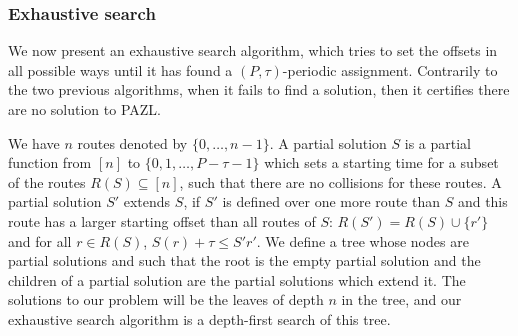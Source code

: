 \documentclass[a4paper,10pt]{article}
\begin{document}
	\subsubsection*{Exhaustive search}
% 
% 

% 	    
      We now present an exhaustive search algorithm, which tries to set the offsets in all possible ways until it has found a $(P,\tau)$-periodic assignment. Contrarily to the two previous algorithms, when it fails to find a solution, then it certifies there are no solution to PAZL.
      
      We have $n$ routes denoted by $\{0,\dots,n-1\}$. A partial solution $S$ is 
      a partial function from $[n]$ to $\{0,1,\dots,P-\tau -1\}$ which sets a starting time for a subset of the routes $R(S) \subseteq [n]$, such that there are no collisions for these routes.  A partial solution $S'$ extends $S$, if $S'$ is defined over one more route than $S$ and this route has a larger starting offset than all routes of $S$: $R(S') = R(S) \cup \{r'\}$ and for all  $r \in R(S)$, $S(r) + \tau \leq S'{r'}$. We define a tree whose nodes are partial solutions and such that the root is the empty partial solution and 
      the children of a partial solution are the partial solutions which extend it. The solutions to our problem will be the leaves of depth $n$ in the tree, and our exhaustive search algorithm is a depth-first search of this tree. 
      
\end{document}
